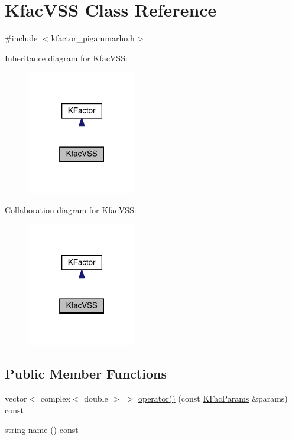 \hypertarget{classKfacVSS}{}\section{Kfac\+V\+SS Class Reference}
\label{classKfacVSS}


{\ttfamily \#include $<$kfactor\+\_\+pigammarho.\+h$>$}



Inheritance diagram for Kfac\+V\+SS\+:
\nopagebreak
\begin{figure}[H]
\begin{center}
\leavevmode
\includegraphics[width=136pt]{d5/d15/classKfacVSS__inherit__graph}
\end{center}
\end{figure}


Collaboration diagram for Kfac\+V\+SS\+:
\nopagebreak
\begin{figure}[H]
\begin{center}
\leavevmode
\includegraphics[width=136pt]{db/d7b/classKfacVSS__coll__graph}
\end{center}
\end{figure}
\subsection*{Public Member Functions}
\begin{DoxyCompactItemize}
\item 
vector$<$ complex$<$ double $>$ $>$ \mbox{\hyperlink{classKfacVSS_a608b90a0b3fcdd1126e63c4ef68ce3e1}{operator()}} (const \mbox{\hyperlink{classKFacParams}{K\+Fac\+Params}} \&params) const
\item 
string \mbox{\hyperlink{classKfacVSS_a12bff0a61d6252df4e362d35c907a877}{name}} () const
\end{DoxyCompactItemize}


